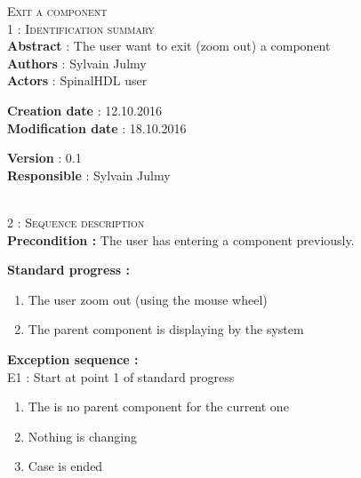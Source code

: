 \begin{flushleft}
    \textsc{\huge Exit a component}\\[0.5cm]

    \BlackLine
    \textsc{\Large 1 : Identification summary}\\[0.3cm]

        \textbf{\large Abstract} : The user want to exit (zoom out) a component\\[0.1cm]

        \textbf{\large Authors} : Sylvain Julmy \\[0.3cm]			

        \textbf{\large Actors} : SpinalHDL user \\[0.1cm]	
    \begin{minipage}{0.40\textwidth}
        \begin{flushleft}	
            \textbf{\large Creation date} : 12.10.2016 \\[0.1cm]

            \textbf{\large Modification date} : 18.10.2016 \\[0.1cm]
        \end{flushleft}
    \end{minipage}
    \begin{minipage}{0.40\textwidth}
        \begin{flushleft}
            \textbf{\large Version} : 0.1 \\[0.1cm]

            \textbf{\large Responsible} : Sylvain Julmy \\[0.1cm]
        \end{flushleft}
    \end{minipage}
    \\[0.5cm]
    \BlackLine
    \textsc{\Large 2 : Sequence description}\\[0.3cm]

    \textbf{\large Precondition :} The user has entering a component previously.

    \textbf{\large  Standard progress :}
    \begin{enumerate}[nosep]
        \item The user zoom out (using the mouse wheel)
        \item The parent component is displaying by the system
    \end{enumerate}

    \textbf{\large  Exception sequence :}\\
    E1 : Start at point 1 of standard progress
    \begin{enumerate}[nosep]
        \item The is no parent component for the current one
        \item Nothing is changing
        \item Case is ended
    \end{enumerate}
    

\end{flushleft}
